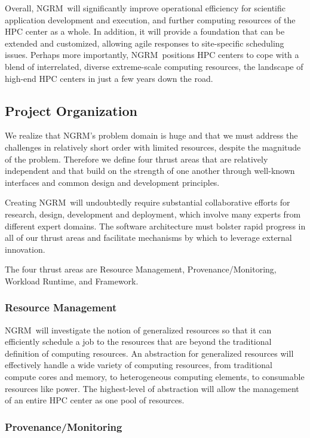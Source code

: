 \documentclass{article}
\newcommand{\ngrm}{NGRM}
\begin{document}
Overall, \ngrm\ will significantly improve operational efficiency for
scientific application development and execution, and further computing
resources of the HPC center as a whole.  In addition, it will provide
a foundation that can be extended and customized, allowing agile responses
to site-specific scheduling issues. Perhaps more importantly, \ngrm\ 
positions HPC centers to cope with a blend of interrelated, diverse
extreme-scale computing resources, the landscape of high-end HPC centers
in just a few years down the road.
\subsection{Project Organization}

We realize that \ngrm 's problem domain is huge and that we must address
the challenges in relatively short order with limited resources, despite
the magnitude of the problem.  Therefore we define four thrust areas
that are relatively independent and that build on the strength of one
another through well-known interfaces and common design and development
principles.  

Creating \ngrm\ will undoubtedly
require substantial collaborative efforts for research, design, development
and deployment, which involve many experts from different expert domains.
The software architecture must bolster rapid progress in all of our thrust
areas and facilitate mechanisms by which to leverage external innovation.

The four thrust areas are Resource Management, Provenance/Monitoring,
Workload Runtime, and Framework.

\subsubsection{Resource Management}

\ngrm\ will investigate the notion of generalized resources so that
it can efficiently schedule a job to the resources that are beyond the
traditional definition of computing resources. An abstraction for
generalized resources will effectively handle a wide variety of computing
resources, from traditional compute cores and memory, to heterogeneous
computing elements, to consumable resources like power.
The highest-level of abstraction will allow the management of an
entire HPC center as one pool of resources.

\subsubsection{Provenance/Monitoring}
\end{document}
